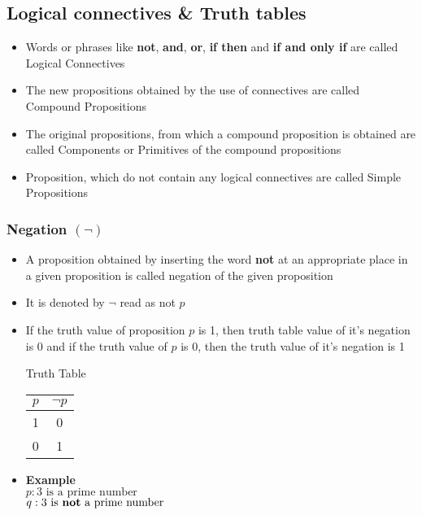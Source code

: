 \documentclass{article}
\begin{document}
	\subsection{Logical connectives \& Truth tables}
	\begin{itemize}
		\item Words or phrases like \textbf{not}, \textbf{and}, \textbf{or}, \textbf{if then}
			and \textbf{if and only if} are called Logical Connectives
		\item The new propositions obtained by the use of connectives are called Compound Propositions
		\item The original propositions, from which a compound proposition is obtained are called
			Components or Primitives of the compound propositions
		\item Proposition, which do not contain any logical connectives are called Simple Propositions
	\end{itemize}

	\subsubsection{Negation $(\neg)$}
	\begin{itemize}
		\item A proposition obtained by inserting the word \textbf{not} at an appropriate place in a
			given proposition is called negation of the given proposition
		\item It is denoted by $\neg$ read as not $p$
		\item If the truth value of proposition $p$ is 1, then truth table value of it's negation is 0
			and if the truth value of $p$ is 0, then the truth value of it's negation is 1
			\begin{center}
				Truth Table \\ \vspace{1em}
				\begin{tabular}{|c|c|} \hline
					$p$ & $\neg p$ \\ \hline
					1 & 0 \\
					0 & 1 \\ \hline
				\end{tabular}
			\end{center}
		\item \textbf{Example} \\
			$p : \text{3 is a prime number}$ \\
			$q : \text{3 is \textbf{not} a prime number}$
	\end{itemize}
\end{document}
